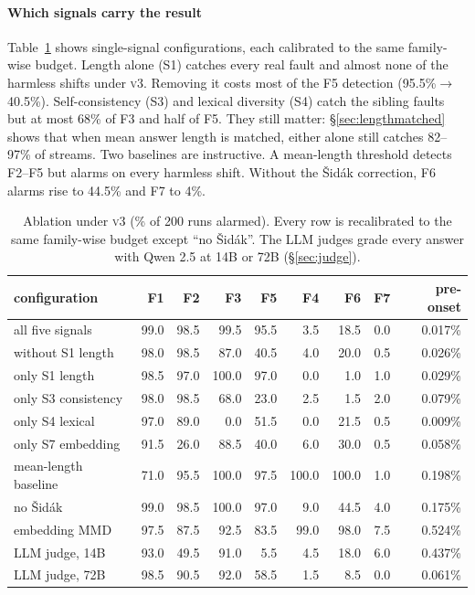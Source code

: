 \documentclass{article}
\newcommand{\vthree}{\textsc{v3}}
\begin{document}
\paragraph{Which signals carry the result}
Table~\ref{tab:ablation} shows single-signal configurations, each calibrated to the
same family-wise budget. Length alone (S1) catches every real fault and almost
none of the harmless shifts under \vthree{}. Removing it costs most of the F5
detection (95.5\%$\to$40.5\%). Self-consistency (S3) and lexical diversity (S4)
catch the sibling faults but at most 68\% of F3 and half of F5. They still matter:
\S\ref{sec:lengthmatched} shows that when mean answer length is matched, either
alone still catches 82--97\% of streams. Two baselines are instructive. A mean-length threshold
detects F2--F5 but alarms on every harmless shift. Without the Šidák correction,
F6 alarms rise to 44.5\% and F7 to 4\%.

\begin{table}[t]
  \centering\small
  \caption{Ablation under \vthree{} (\% of 200 runs alarmed). Every row is
  recalibrated to the same family-wise budget except ``no Šidák''. The LLM
  judges grade every answer with Qwen 2.5 at 14B or 72B (\S\ref{sec:judge}).}
  \label{tab:ablation}
  \setlength{\tabcolsep}{4.5pt}
  \begin{tabular}{lrrrr|rrr|r}
    \toprule
    configuration & F1 & F2 & F3 & F5 & F4 & F6 & F7 & pre-onset \\
    \midrule
    all five signals & 99.0 & 98.5 & 99.5 & 95.5 & 3.5 & 18.5 & 0.0 & 0.017\% \\
    without S1 length & 98.0 & 98.5 & 87.0 & 40.5 & 4.0 & 20.0 & 0.5 & 0.026\% \\
    only S1 length & 98.5 & 97.0 & 100.0 & 97.0 & 0.0 & 1.0 & 1.0 & 0.029\% \\
    only S3 consistency & 98.0 & 98.5 & 68.0 & 23.0 & 2.5 & 1.5 & 2.0 & 0.079\% \\
    only S4 lexical & 97.0 & 89.0 & 0.0 & 51.5 & 0.0 & 21.5 & 0.5 & 0.009\% \\
    only S7 embedding & 91.5 & 26.0 & 88.5 & 40.0 & 6.0 & 30.0 & 0.5 & 0.058\% \\
    \midrule
    mean-length baseline & 71.0 & 95.5 & 100.0 & 97.5 & 100.0 & 100.0 & 1.0 & 0.198\% \\
    no Šidák & 99.0 & 98.5 & 100.0 & 97.0 & 9.0 & 44.5 & 4.0 & 0.175\% \\
    embedding MMD & 97.5 & 87.5 & 92.5 & 83.5 & 99.0 & 98.0 & 7.5 & 0.524\% \\
    LLM judge, 14B & 93.0 & 49.5 & 91.0 & 5.5 & 4.5 & 18.0 & 6.0 & 0.437\% \\
    LLM judge, 72B & 98.5 & 90.5 & 92.0 & 58.5 & 1.5 & 8.5 & 0.0 & 0.061\% \\
    \bottomrule
  \end{tabular}
\end{table}
\end{document}
